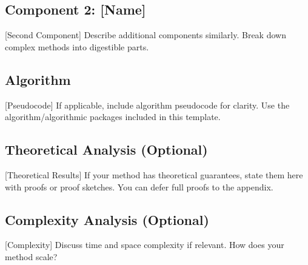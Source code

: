 
\subsection{Component 2: [Name]}
\label{sec:component2}

[Second Component] Describe additional components similarly. Break down complex methods into digestible parts.

\subsection{Algorithm}
\label{sec:algorithm}

[Pseudocode] If applicable, include algorithm pseudocode for clarity. Use the algorithm/algorithmic packages included in this template.


\subsection{Theoretical Analysis (Optional)}
\label{sec:theory}

[Theoretical Results] If your method has theoretical guarantees, state them here with proofs or proof sketches. You can defer full proofs to the appendix.


\subsection{Complexity Analysis (Optional)}
\label{sec:complexity}

[Complexity] Discuss time and space complexity if relevant. How does your method scale?
